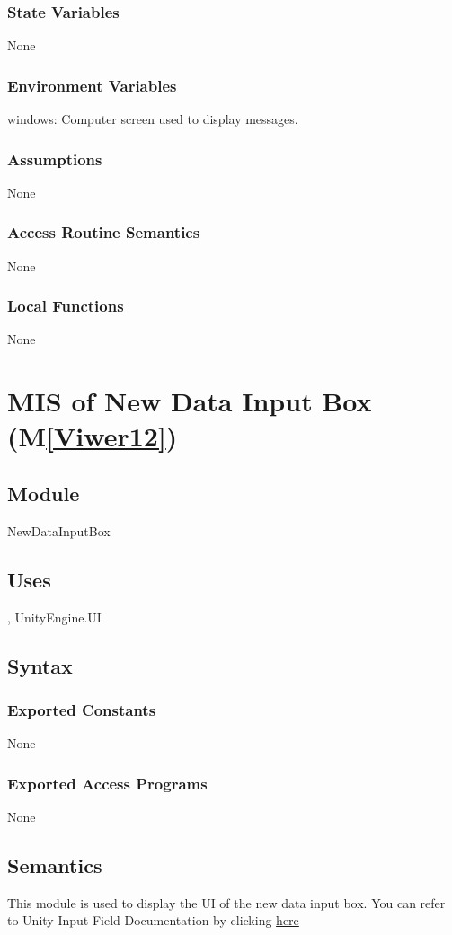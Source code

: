 \documentclass[12pt, titlepage]{article}
\newcommand{\mref}[1]{M\ref{#1}}
\begin{document}
\subsubsection{State Variables}
None
\subsubsection{Environment Variables}
windows: Computer screen used to display messages.
\subsubsection{Assumptions}
None
\subsubsection{Access Routine Semantics}
None
\subsubsection{Local Functions}
None

\newpage

\section{MIS of New Data Input Box (\mref{Viwer12})}

\subsection{Module}
NewDataInputBox

\subsection{Uses} ,
UnityEngine.UI

\subsection{Syntax}
\subsubsection{Exported Constants}
None
\subsubsection{Exported Access Programs}
None

\subsection{Semantics}
This module is used to display the UI of the new data input box.
You can refer to Unity Input Field Documentation by clicking 
\href{https://docs.unity3d.com/Packages/com.unity.ugui@1.0/manual/script-InputField.html}{here}
\end{document}
